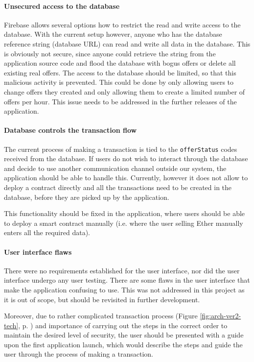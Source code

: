 \paragraph{Unsecured access to the database}
Firebase allows several options how to restrict the read and write access to the database. With the current setup however, anyone who has the database reference string (database URL) can read and write all data in the database. This is obviously not secure, since anyone could retrieve the string from the application source code and flood the database with bogus offers or delete all existing real offers. The access to the database should be limited, so that this malicious activity is prevented. This could be done by only allowing users to change offers they created and only allowing them to create a limited number of offers per hour. This issue needs to be addressed in the further releases of the application.

\paragraph{Database controls the transaction flow}
The current process of making a transaction is tied to the \texttt{offerStatus} codes received from the database. If users do not wish to interact through the database and decide to use another communication channel outside our system, the application should be able to handle this. Currently, however it does not allow to deploy a contract directly and all the transactions need to be created in the database, before they are picked up by the application.

This functionality should be fixed in the application, where users should be able to deploy a smart contract manually (i.e. where the user selling Ether manually enters all the required data).
% 
\paragraph{User interface flaws}
There were no requirements established for the user interface, nor did the user interface undergo any user testing. There are some flaws in the user interface that make the application confusing to use. This was not addressed in this project as it is out of scope, but should be revisited in further development.

Moreover, due to rather complicated transaction process (Figure \ref{fig:arch-ver2-tech}, p. \pageref{fig:arch-ver2-tech}) and importance of carrying out the steps in the correct order to maintain the desired level of security, the user should be presented with a guide upon the first application launch, which would describe the steps and guide the user through the process of making a transaction.

